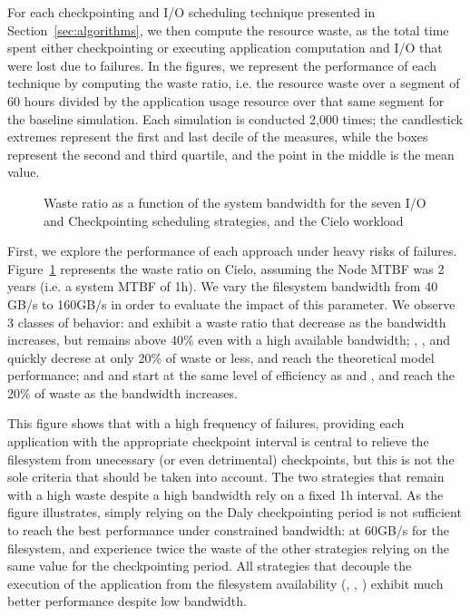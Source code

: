For each checkpointing and I/O scheduling technique presented in
Section~\ref{sec:algorithms}, we then compute the resource waste, as
the total time spent either checkpointing or executing application computation and I/O that were lost due to failures. In the figures, we represent the
performance of each technique by computing the waste ratio, i.e. the
resource waste over a segment of 60 hours divided by the application
usage resource over that same segment for the baseline
simulation. Each simulation is conducted 2,000 times; the
candlestick extremes represent the first and last decile of the
measures, while the boxes represent the second and third quartile, and
the point in the middle is the mean value.

\begin{figure}
  \begin{center}
    \resizebox{\linewidth}{!}{}
  \end{center}
  \caption{Waste ratio as a function of the system bandwidth for the
    seven I/O and Checkpointing scheduling strategies, and the Cielo
    workload \label{fig:cielo-1hmtbf}}
\end{figure}

First, we explore the performance of each approach under heavy risks
of failures. Figure~\ref{fig:cielo-1hmtbf} represents the waste ratio
on Cielo, assuming the Node MTBF was 2 years (i.e. a system MTBF of 1h). We vary the
filesystem bandwidth from 40 GB/s to 160GB/s in order to evaluate the
impact of this parameter. We observe 3 classes of behavior: \propfixed
and \bfifofixed exhibit a waste ratio that decrease as the bandwidth
increases, but remains above 40\% even with a high available
bandwidth; \fifodaly, \fifofixed, and \cooperative quickly decrese at
only 20\% of waste or less, and reach the theoretical model
performance; and \propdaly and \bfifodaly start at the same level of
efficiency as \propfixed and \bfifofixed, and reach the 20\% of waste
as the bandwidth increases.

This figure shows that with a high frequency of failures, providing
each application with the appropriate checkpoint interval is central
to relieve the filesystem from unecessary (or even detrimental)
checkpoints, but this is not the sole criteria that should be taken
into account. The two strategies that remain with a high waste despite
a high bandwidth rely on a fixed 1h interval. As the figure
illustrates, simply relying on the Daly checkpointing period is not
sufficient to reach the best performance under constrained bandwidth:
at 60GB/s for the filesystem, \propdaly and \bfifodaly experience
twice the waste of the other strategies relying on the same value for
the checkpointing period. All strategies that decouple the execution
of the application from the filesystem availability (\fifodaly,
\fifofixed, \cooperative) exhibit much better performance despite low
bandwidth.

